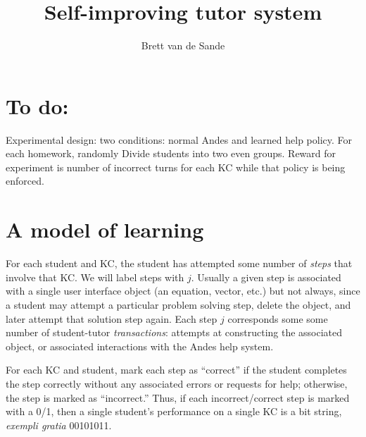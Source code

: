 \documentclass[11pt,letterpaper]{article}
\begin{document}
\title{Self-improving tutor system}
\author{Brett van de Sande}

%


\maketitle

\section*{To do:}

Experimental design:  two conditions: normal Andes and learned
help policy.  For each homework, randomly Divide students into two 
even groups.  Reward for experiment is number of incorrect turns
for each KC while that policy is being enforced.

\section{A model of learning}

For each student and KC, the student has attempted some number of 
{\em steps} that involve that KC.   We will label
steps with $j$.  Usually a given step is associated
with a single user interface object (an equation, vector, etc.)  but
not always, since a student may attempt a particular problem solving
step, delete the object, and later attempt that solution step again.
Each step $j$ corresponds some some number of student-tutor 
{\em transactions}: attempts at constructing the associated object, 
or associated interactions with the Andes help system.  

For each KC and student, mark each step as ``correct'' if
the student completes the step correctly without any associated errors or 
requests for help; otherwise, the step is marked as ``incorrect.''
%
Thus, if each incorrect/correct step is marked with a 0/1, then
a single student's performance on a single KC is a bit string,
{\em exempli gratia} 00101011.
\end{document}
